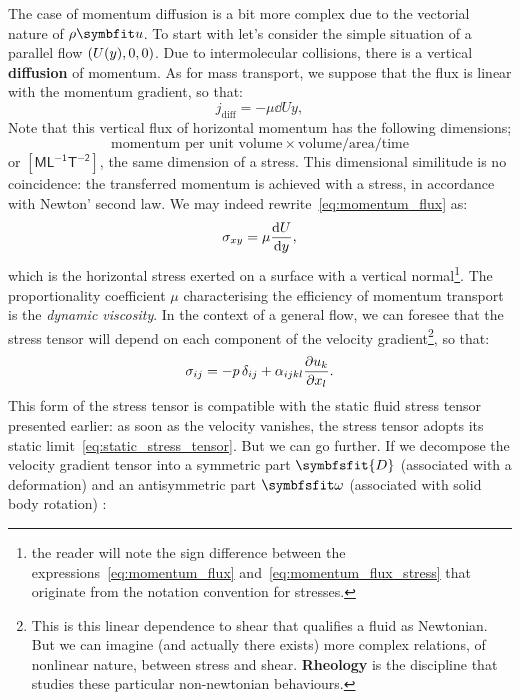  The case of momentum diffusion is a bit more complex due to the vectorial nature of $\rho \bu$. To start with let's consider the simple situation of a parallel flow $\left( U(y),0,0\right)$. Due to intermolecular collisions, there is a vertical \textbf{diffusion} of momentum. As for mass transport, we suppose that the flux is linear with the momentum gradient, so that:
\begin{equation}
j_\text{diff} = -\mu \dd{U}{y},
\label{eq:momentum_flux}
\end{equation}
Note that this vertical flux of horizontal momentum has the following dimensions;
$$
\text{momentum per unit volume} \times \text{volume} / \text{area} / \text{time}
$$
or $[\mathsf{ML^{-1}T^{-2}}]$, the same dimension of a stress. This dimensional similitude is no coincidence: the transferred momentum is achieved with a stress, in accordance with Newton' second law. We may indeed rewrite~\eqref{eq:momentum_flux} as:
\begin{equation}
\sigma_{xy} = \mu \frac{\mathrm d U}{\mathrm d y},
\label{eq:momentum_flux_stress}
\end{equation}
which is the horizontal stress exerted on a surface with a vertical normal\footnote{the reader will note the sign difference between the expressions~\eqref{eq:momentum_flux} and~\eqref{eq:momentum_flux_stress} that originate from the notation convention for stresses.}. The proportionality coefficient $\mu$ characterising the efficiency of momentum transport is the \textit{dynamic viscosity}.
 In the context of a general flow, we can foresee that the stress tensor will depend on each component of the velocity gradient\footnote{This is this linear dependence to shear that qualifies a fluid as Newtonian. But we can imagine (and actually there exists) more complex relations, of nonlinear nature, between stress and shear. \textbf{Rheology} is the discipline that studies these particular non-newtonian behaviours.}, so that:
\begin{equation}
\sigma_{ij} = -p \,\delta_{ij} + \alpha_{ijkl} \frac{\partial u_k}{\partial x_l}.
\end{equation}
This form of the stress tensor is compatible with the static fluid stress tensor presented earlier: as soon as the velocity vanishes, the stress tensor adopts its static limit~\eqref{eq:static_stress_tensor}. But we can go further. If we decompose the velocity gradient tensor into a symmetric part $\symbfsfit{D}$ (associated with a deformation) and an antisymmetric part $\symbfsfit \omega$ (associated with solid body rotation) :
